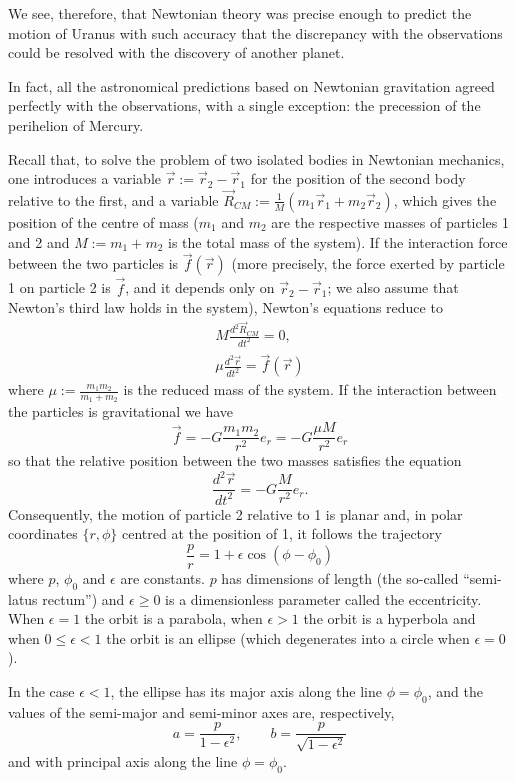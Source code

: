 \begin{points}
\item We see, therefore, that Newtonian theory was precise enough to predict the motion of Uranus with such accuracy that the discrepancy with the observations could be resolved with the discovery of another planet.

\item In fact, all the astronomical predictions based on Newtonian gravitation agreed perfectly with the observations, with a single exception: the precession of the perihelion of Mercury.

\item Recall that, to solve the problem of two isolated bodies in Newtonian mechanics, one introduces a variable $\vec r:=\vec r_2-\vec r_1$ for the position of the second body relative to the first, and a variable $\vec R_{CM}:=\frac1M(m_1\vec r_1+m_2\vec r_2)$, which gives the position of the centre of mass ($m_1$ and $m_2$ are the respective masses of particles 1 and 2 and $M:=m_1+m_2$ is the total mass of the system). If the interaction force between the two particles is $\vec f(\vec r)$ (more precisely, the force exerted by particle 1 on particle 2 is $\vec f$, and it depends only on $\vec r_2-\vec r_1$; we also assume that Newton's third law holds in the system), Newton's equations reduce to
\begin{gather*}
  M\frac{d^2\vec R_{CM}}{dt^2}=0,\\
  \mu\frac{d^2\vec r}{dt^2}=\vec f(\vec r)
\end{gather*}
where $\mu:=\frac{m_1m_2}{m_1+m_2}$ is the reduced mass of the system. If the interaction between the particles is gravitational we have
\[
  \vec f=-G\frac{m_1m_2}{r^2}e_r=-G\frac{\mu M}{r^2}e_r
\]
so that the relative position between the two masses satisfies the equation
\[
  \frac{d^2\vec r}{dt^2}=-G\frac{M}{r^2}e_r .
\]
Consequently, the motion of particle 2 relative to 1 is planar and, in polar coordinates $\{r,\phi\}$ centred at the position of 1, it follows the trajectory
\[
  \frac pr=1+\epsilon\cos(\phi-\phi_0)
\]
where $p$, $\phi_0$ and $\epsilon$ are constants. $p$ has dimensions of length (the so-called ``semi-latus rectum'') and $\epsilon\geq0$ is a dimensionless parameter called the eccentricity. When $\epsilon=1$ the orbit is a parabola, when $\epsilon>1$ the orbit is a hyperbola and when $0\leq\epsilon<1$ the orbit is an ellipse (which degenerates into a circle when $\epsilon=0$).

\item In the case $\epsilon<1$, the ellipse has its major axis along the line $\phi=\phi_0$, and the values of the semi-major and semi-minor axes are, respectively,
\[
  a=\frac{p}{1-\epsilon^2},\qquad b=\frac{p}{\sqrt{1-\epsilon^2}}
\]
and with principal axis along the line $\phi=\phi_0$.


\end{points}
